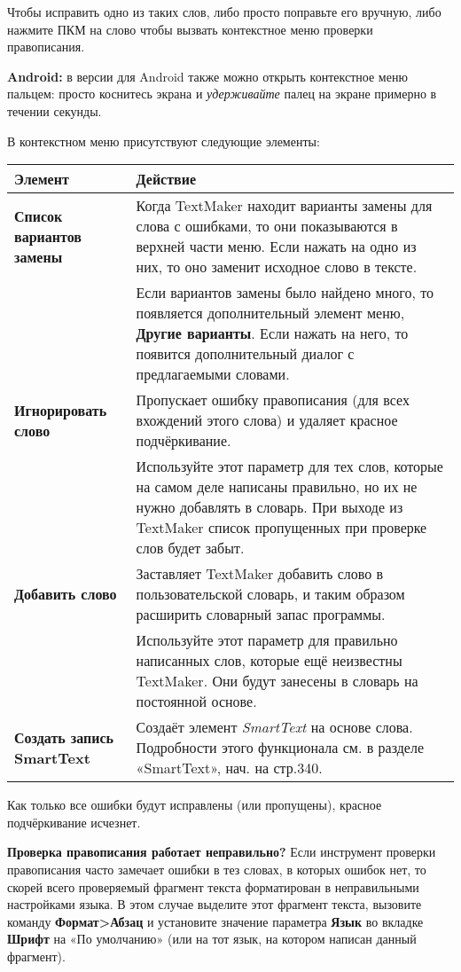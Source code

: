 ﻿\documentclass[a4paper,10pt]{article}
\begin{document}
Чтобы исправить одно из таких слов, либо просто поправьте его вручную, либо нажмите ПКМ на слово чтобы вызвать контекстное меню проверки правописания.

\textbf{Android:} в версии для Android также можно открыть контекстное меню пальцем: просто коснитесь экрана и \textit{удерживайте} палец на экране примерно в течении секунды.

В контекстном меню присутствуют следующие элементы:

\begin{center}
\begin{tabular}{  m{5cm}  m{11cm}  }
 \textbf{Элемент} & \textbf{Действие}\\ 
 \hline
  \textbf{Список вариантов замены} & Когда TextMaker находит варианты замены для слова с ошибками, то они показываются в верхней части меню. Если нажать на одно из них, то оно заменит исходное слово в тексте.\\
   & Если вариантов замены было найдено много, то появляется дополнительный элемент меню, \textbf{Другие варианты}. Если нажать на него, то появится дополнительный диалог с предлагаемыми словами.\\ 
\textbf{Игнорировать слово} & Пропускает ошибку правописания (для всех вхождений этого слова) и удаляет красное подчёркивание.\\
 & Используйте этот параметр для тех слов, которые на самом деле написаны правильно, но их не нужно добавлять в словарь. При выходе из TextMaker список пропущенных при проверке слов будет забыт.\\
\textbf{Добавить слово} & Заставляет TextMaker добавить слово в пользовательской словарь, и таким образом расширить словарный запас программы.\\
 & Используйте этот параметр для правильно написанных слов, которые ещё неизвестны TextMaker. Они будут занесены в словарь на постоянной основе.\\
 \textbf{Создать запись SmartText} & Создаёт элемент \textit{SmartText} на основе слова. Подробности этого функционала см. в разделе «SmartText», нач. на стр.340.
\end{tabular}
\end{center}

Как только все ошибки будут исправлены (или пропущены), красное подчёркивание исчезнет.

\textbf{Проверка правописания работает неправильно?} Если инструмент проверки правописания часто замечает ошибки в тез словах, в которых ошибок нет, то скорей всего проверяемый фрагмент текста форматирован в неправильными настройками языка. В этом случае выделите этот фрагмент текста, вызовите команду \textbf{Формат>Абзац} и установите значение параметра \textbf{Язык} во вкладке \textbf{Шрифт} на «По умолчанию» (или на тот язык, на котором написан данный фрагмент).
\end{document}

